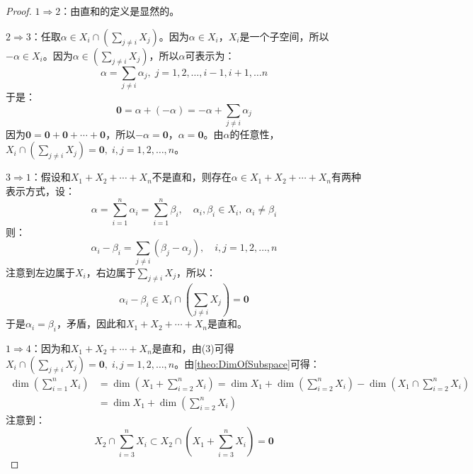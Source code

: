 \begin{proof}
	$1\Rightarrow2$：由直和的定义是显然的。\par
	$2\Rightarrow3$：任取$\alpha\in X_i\cap\left(\sum\limits_{j\ne i}X_j\right)$。因为$\alpha\in X_i$，$X_i$是一个子空间，所以$-\alpha\in X_i$。因为$\alpha\in\left(\sum\limits_{j\ne i}X_j\right)$，所以$\alpha$可表示为：
	\begin{equation*}
		\alpha=\sum_{j\ne i}\alpha_j,\;j=1,2,\dots,i-1,i+1,\dots n
	\end{equation*}
	于是：
	\begin{equation*}
		\mathbf{0}=\alpha+(-\alpha)=-\alpha+\sum_{j\ne i}\alpha_j
	\end{equation*}
	因为$\mathbf{0}=\mathbf{0}+\mathbf{0}+\cdots+\mathbf{0}$，所以$-\alpha=\mathbf{0}$，$\alpha=\mathbf{0}$。由$\alpha$的任意性，$X_i\cap\left(\sum\limits_{j\ne i}X_j\right)=\mathbf{0},\;i,j=1,2,\dots,n$。\par
	$3\Rightarrow1$：假设和$X_1+X_2+\cdots+X_n$不是直和，则存在$\alpha\in X_1+X_2+\cdots+X_n$有两种表示方式，设：
	\begin{equation*}
		\alpha=\sum_{i=1}^{n}\alpha_i=\sum_{i=1}^{n}\beta_i,\quad
		\alpha_i,\beta_i\in X_i,\;\alpha_i\ne\beta_i
	\end{equation*}
	则：
	\begin{equation*}
		\alpha_i-\beta_i=\sum_{j\ne i}(\beta_j-\alpha_j),\quad i,j=1,2,\dots,n
	\end{equation*}
	注意到左边属于$X_i$，右边属于$\sum\limits_{j\ne i}X_j$，所以：
	\begin{equation*}
		\alpha_i-\beta_i\in X_i\cap\left(\sum\limits_{j\ne i}X_j\right)=\mathbf{0}
	\end{equation*}
	于是$\alpha_i=\beta_i$，矛盾，因此和$X_1+X_2+\cdots+X_n$是直和。\par
	$1\Rightarrow4$：因为和$X_1+X_2+\cdots+X_n$是直和，由(3)可得$X_i\cap\left(\sum\limits_{j\ne i}X_j\right)=\mathbf{0},\;i,j=1,2,\dots,n$。由\cref{theo:DimOfSubspace}可得：
	\begin{align*}
		\dim\left(\sum_{i=1}^{n}X_i\right)
		&=\dim\left(X_1+\sum_{i=2}^{n}X_i\right)
		=\dim X_1+\dim\left(\sum_{i=2}^{n}X_i\right)-\dim\left(X_1\cap\sum_{i=2}^{n}X_i\right) \\
		&=\dim X_1+\dim\left(\sum_{i=2}^{n}X_i\right)
	\end{align*}
	注意到：
	\begin{equation*}
		X_2\cap\sum_{i=3}^{n}X_i\subset X_2\cap\left(X_1+\sum_{i=3}^{n}X_i\right)=\mathbf{0}
	\end{equation*}

\end{proof}
